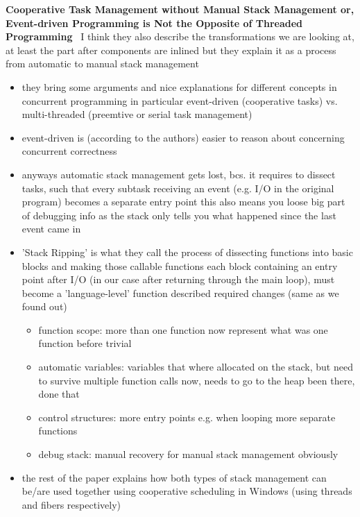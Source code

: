 \textbf{Cooperative Task Management without Manual Stack Management
or, Event-driven Programming is Not the Opposite of Threaded Programming}~\cite{adya2002cooperative}
\means I think they also describe the transformations we are looking at, at least the part after components are inlined  but they explain it as a process from automatic to manual stack management
\begin{itemize}
    \item they bring some arguments and nice explanations for different concepts in
    concurrent programming in particular event-driven (cooperative tasks) vs. multi-threaded (preemtive or serial task management)
    \item event-driven is (according to the authors) easier to reason about concerning concurrent correctness
    \item anyways automatic stack management gets lost, bcs. it requires to dissect tasks, such that every subtask receiving an event (e.g. I/O in the original program) becomes a separate entry point \means this also means you loose big part of debugging info as the stack only tells you what happened since the last event came in
    \item 'Stack Ripping' is what they call the process of dissecting functions into basic blocks and making those callable functions \means each block containing an entry point after I/O (in our case after returning through the main loop), must become a 'language-level' function
    described required changes (same as we found out)
    \begin{itemize}
        \item function scope: more than one function now represent what was one function before \means trivial
        \item automatic variables: variables that where allocated on the stack, but need to survive multiple function calls now, needs to go to the heap \means been there, done that
        \item control structures: \means more entry points e.g. when looping \means more separate functions
        \item debug stack: manual recovery for manual stack management obviously
    \end{itemize}
    \item the rest of the paper explains how both types of stack management can be/are used together using cooperative scheduling in Windows (using threads and fibers respectively)
\end{itemize}

